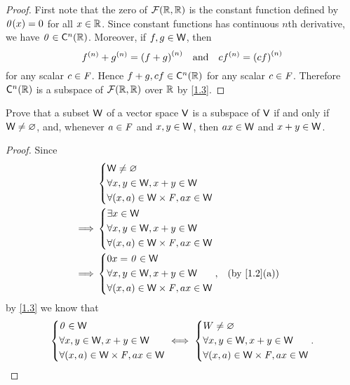 \begin{proof}
  First note that the zero of \(\fs{\R}{\R}\) is the constant function defined by \(\zv\p{x} = 0\) for all \(x \in \mathbb{R}\).
  Since constant functions has continuous \(n\)th derivative, we have \(\zv \in \cfs[n]{\R}\).
  Moreover, if \(f, g \in \mathsf{W}\), then
  \[
    f^{\p{n}} + g^{\p{n}} = \p{f + g}^{\p{n}} \quad \text{and} \quad cf^{\p{n}} = \p{cf}^{\p{n}}
  \]
  for any scalar \(c \in \mathit{F}\).
  Hence \(f + g, cf \in \cfs[n]{\R}\) for any scalar \(c \in \mathit{F}\).
  Therefore \(\cfs[n]{\R}\) is a subspace of \(\fs{\R}{\R}\) over \(\mathbb{R}\) by \cref{1.3}.
\end{proof}

\begin{ex}\label{ex:1.3.17}
  Prove that a subset \(\mathsf{W}\) of a vector space \(\mathsf{V}\) is a subspace of \(\mathsf{V}\) if and only if \(\mathsf{W} \neq \varnothing\), and, whenever \(a \in \mathit{F}\) and \(x, y \in \mathsf{W}\), then \(ax \in \mathsf{W}\) and \(x + y \in \mathsf{W}\).
\end{ex}

\begin{proof}
  Since
  \begin{align*}
             & \begin{dcases}
      \W \neq \varnothing               \\
      \forall x, y \in \W, x + y \in \W \\
      \forall (x, a) \in \W \times \F, ax \in \W
    \end{dcases}                                 \\
    \implies & \begin{dcases}
      \exists x \in \W                  \\
      \forall x, y \in \W, x + y \in \W \\
      \forall (x, a) \in \W \times \F, ax \in \W
    \end{dcases}                                 \\
    \implies & \begin{dcases}
      0x = \zv \in \W                   \\
      \forall x, y \in \W, x + y \in \W \\
      \forall (x, a) \in \W \times \F, ax \in \W
    \end{dcases}, &  & \text{(by \cref{1.2}(a))}
  \end{align*}
  by \cref{1.3} we know that
  \[
    \begin{dcases}
      \mathit{0} \in \mathsf{W}                        \\
      \forall x, y \in \mathsf{W}, x + y \in \mathsf{W} \\
      \forall (x, a) \in \mathsf{W} \times \mathit{F}, ax \in \mathsf{W}
    \end{dcases} \iff \begin{dcases}
      W \neq \varnothing                \\
      \forall x, y \in \mathsf{W}, x + y \in \mathsf{W} \\
      \forall (x, a) \in \mathsf{W} \times \mathit{F}, ax \in \mathsf{W}
    \end{dcases}.
  \]
\end{proof}

